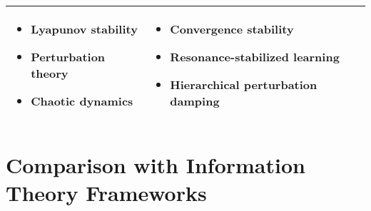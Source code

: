 \begin{center}
\begin{tabular}{|p{3cm}|p{5cm}|p{5cm}|}
\begin{itemize}
    \item Lyapunov stability
    \item Perturbation theory
    \item Chaotic dynamics
\end{itemize} &
\begin{itemize}
    \item Convergence stability
    \item Resonance-stabilized learning
    \item Hierarchical perturbation damping
\end{itemize} \\
\hline
\end{tabular}
\label{tab:physics_comparison}
\end{center}

\section{Comparison with Information Theory Frameworks}

